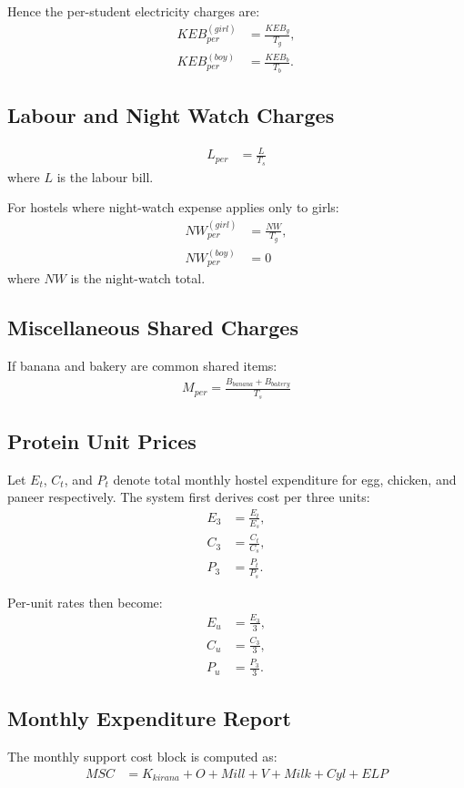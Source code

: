 \documentclass[conference]{IEEEtran}
\begin{document}
Hence the per-student electricity charges are:
\begin{align}
KEB^{(girl)}_{per} &= \frac{KEB_g}{T_g}, \\
KEB^{(boy)}_{per} &= \frac{KEB_b}{T_b}.
\end{align}

\subsection{Labour and Night Watch Charges}
\begin{align}
L_{per} &= \frac{L}{T_s}
\end{align}
where \(L\) is the labour bill.

For hostels where night-watch expense applies only to girls:
\begin{align}
NW^{(girl)}_{per} &= \frac{NW}{T_g}, \\
NW^{(boy)}_{per} &= 0
\end{align}
where \(NW\) is the night-watch total.

\subsection{Miscellaneous Shared Charges}
If banana and bakery are common shared items:
\begin{align}
M_{per} = \frac{B_{banana} + B_{bakery}}{T_s}
\end{align}

\subsection{Protein Unit Prices}
Let \(E_t\), \(C_t\), and \(P_t\) denote total monthly hostel expenditure for egg, chicken, and paneer respectively. The system first derives cost per three units:
\begin{align}
E_{3} &= \frac{E_t}{E_s}, \\
C_{3} &= \frac{C_t}{C_s}, \\
P_{3} &= \frac{P_t}{P_s}.
\end{align}

Per-unit rates then become:
\begin{align}
E_{u} &= \frac{E_{3}}{3}, \\
C_{u} &= \frac{C_{3}}{3}, \\
P_{u} &= \frac{P_{3}}{3}.
\end{align}

\subsection{Monthly Expenditure Report}
The monthly support cost block is computed as:
\begin{align}
MSC &= K_{kirana} + O + Mill + V + Milk + Cyl + ELP
\end{align}
\end{document}
